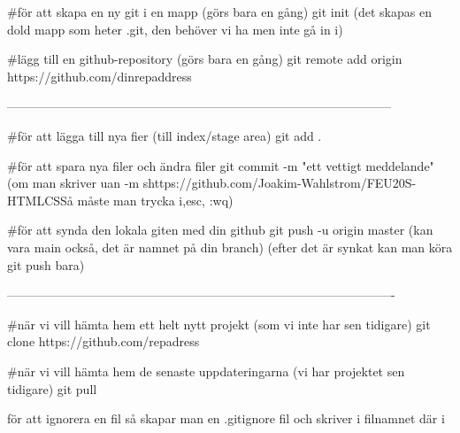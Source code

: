 #för att skapa en ny git i en mapp (görs bara en gång)
        git init
        (det skapas en dold mapp som heter .git, den behöver vi ha men inte gå in i)


#lägg till en github-repository (görs bara en gång)
        git remote add origin https://github.com/dinrepaddress

---------------------------------------------------------------------------------------------

#för att lägga till nya fier (till index/stage area)
        git add .

#för att spara nya filer och ändra filer
       git commit -m "ett vettigt meddelande"
       (om man skriver uan -m shttps://github.com/Joakim-Wahlstrom/FEU20S-HTMLCSSå måste man trycka i,esc, :wq)
 
#för att synda den lokala giten med din github
        git push -u origin master (kan vara main också, det är namnet på din branch)
        (efter det är synkat kan man köra git push bara)

----------------------------------------------------------------------------------------------

#när vi vill hämta hem ett helt nytt projekt (som vi inte har sen tidigare)
     git clone https://github.com/repadress

#när vi vill hämta hem de senaste uppdateringarna (vi har projektet sen tidigare) 
    git pull



för att ignorera en fil så skapar man en .gitignore fil och skriver i filnamnet där i 


